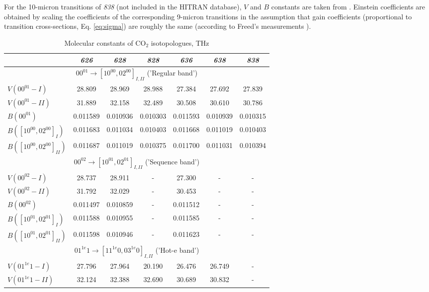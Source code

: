 \documentclass{report}
\begin{document}
\begin{appendices}
For the 10-micron transitions of \textit{838} (not included in the HITRAN database), $V$ and $B$ constants are taken from \cite{Maki-1994}. Einstein coefficients are obtained by scaling the coefficients of the corresponding 9-micron transitions in the assumption that gain coefficients (proportional to transition cross-sections, Eq. \ref{eq:sigma}) are roughly the same (according to Freed's measurements \cite{Freed-1982}).


\begin{table}
\centering
\caption{Molecular constants of CO$_2$ isotopologues, THz}
\label{table:VB}
\footnotesize
\begin{tabular}{|l|cccccc|}
\hline
& \textit{626} & \textit{628} & \textit{828} & \textit{636} & \textit{638} & \textit{838}\\
\hline
\multicolumn{7}{|c|}{$00^01\rightarrow[10^00,02^00]_{I,II}$ ('Regular band')}\\
\hline
$V(00^01-I)$            & 28.809 & 28.969 & 28.988 & 27.384 & 27.692 & 27.839\\
$V(00^01-II)$           & 31.889 & 32.158 & 32.489 & 30.508 & 30.610 & 30.786\\
$B(00^01)$              & 0.011589 & 0.010936 & 0.010303 & 0.011593 & 0.010939 & 0.010315\\
$B([10^00,02^00]_I)$    & 0.011683 & 0.011034 & 0.010403 & 0.011668 & 0.011019 & 0.010403\\
$B([10^00,02^00]_{II})$ & 0.011687 & 0.011019 & 0.010375 & 0.011700 & 0.011031 & 0.010394\\
\hline
\multicolumn{7}{|c|}{$00^02\rightarrow[10^01,02^01]_{I,II}$ ('Sequence band')}\\
\hline
$V(00^02-I)$            & 28.737 & 28.911 & - & 27.300 & - & -\\
$V(00^02-II)$           & 31.792 & 32.029 & - & 30.453 & - & -\\
$B(00^02)$              & 0.011497 & 0.010859 & - & 0.011512 & - & -\\
$B([10^01,02^01]_I)$    & 0.011588 & 0.010955 & - & 0.011585 & - & -\\
$B([10^01,02^01]_{II})$ & 0.011598 & 0.010946 & - & 0.011623 & - & -\\
\hline
\multicolumn{7}{|c|}{$01^{1e}1\rightarrow[11^{1e}0,03^{1e}0]_{I,II}$ ('Hot-e band')}\\
\hline
$V(01^{1e}1-I)$               & 27.796 & 27.964 & 20.190 & 26.476 & 26.749 & -\\
$V(01^{1e}1-II)$              & 32.124 & 32.388 & 32.690 & 30.689 & 30.832 & -\\

\end{tabular}
\end{table}
\end{appendices}
\end{document}
